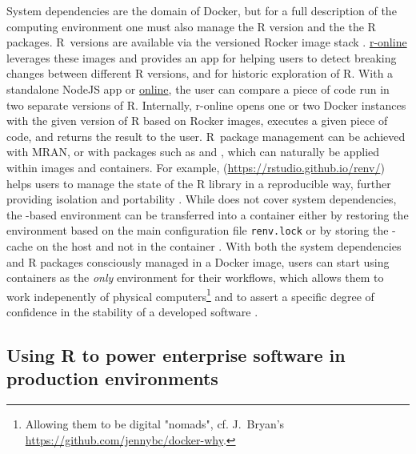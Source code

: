 System dependencies are the domain of Docker, but for a full description
of the computing environment one must also manage the R version and the
the R packages. R~versions are available via the versioned Rocker image
stack \citep{RJ-2017-065}.
\href{https://github.com/ColinFay/ronline}{r-online} leverages these
images and provides an app for helping users to detect breaking changes
between different R versions, and for historic exploration of R. With a
standalone NodeJS app or
\href{https://srv.colinfay.me/r-online}{online}, the user can compare a
piece of code run in two separate versions of R. Internally, r-online
opens one or two Docker instances with the given version of R based on
Rocker images, executes a given piece of code, and returns the result to
the user. R~package management can be achieved with MRAN, or with
packages such as  and \textbf{}, which
can naturally be applied within images and containers. For example,
 (\url{https://rstudio.github.io/renv/}) helps users to
manage the state of the R library in a reproducible way, further
providing isolation and portability \citep{renv2019}. While
 does not cover system dependencies, the
-based environment can be transferred into a container
either by restoring the environment based on the main configuration file
\texttt{renv.lock} or by storing the -cache on the host
and not in the container \citep{ushey_using_2019}. With both the system
dependencies and R packages consciously managed in a Docker image, users
can start using containers as the \emph{only} environment for their
workflows, which allows them to work indepenently of physical
computers\footnote{Allowing them to be digital "nomads", cf. J.~Bryan's \href{https://github.com/jennybc/docker-why}{https://github.com/jennybc/docker-why}.}
and to assert a specific degree of confidence in the stability of a
developed software
\citep[cf. \texttt{README.Rmd} in][]{marwick_research_2017}.

\hypertarget{using-r-to-power-enterprise-software-in-production-environments}{%
\subsection{Using R to power enterprise software in production
environments}\label{using-r-to-power-enterprise-software-in-production-environments}}

\label{enterprise}

